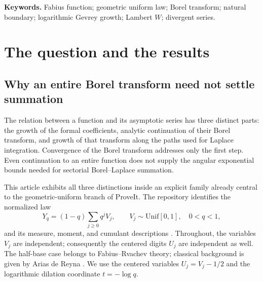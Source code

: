 \documentclass[11pt,a4paper]{article}
\numberwithin{equation}{section}
\theoremstyle{definition}
\theoremstyle{remark}
\begin{document}
\begin{titlepage}
\begin{abstract}
The proofs are self-contained after standard Bernoulli and hyperbolic-function identities. Exact rational checks and high-precision experiments accompany them. The results address a specified endpoint growth-and-summation question, not the separate minimal-moment-denominator conjecture. No Lean certification or independently established worldwide priority is asserted.
\end{abstract}
\vfill
{\small\textbf{Keywords.} Fabius function; geometric uniform law; Borel transform; natural boundary; logarithmic Gevrey growth; Lambert $W$; divergent series.\par}
\end{titlepage}
\hypersetup{pageanchor=true}

\begingroup
\small
\setlength{\parskip}{0pt}
\tableofcontents
\endgroup
\newpage
{}

\section{The question and the results}
\label{sec:intro}

\subsection{Why an entire Borel transform need not settle summation}
The relation between a function and its asymptotic series has three distinct parts: the growth of the formal coefficients, analytic continuation of their Borel transform, and growth of that transform along the paths used for Laplace integration. Convergence of the Borel transform addresses only the first step. Even continuation to an entire function does not supply the angular exponential bounds needed for sectorial Borel--Laplace summation.

This article exhibits all three distinctions inside an explicit family already central to the geometric-uniform branch of ProveIt. The repository identifies the normalized law
\begin{equation}
 Y_q=(1-q)\sum_{j\ge0}q^jV_j,
 \qquad V_j\sim\mathrm{Unif}[0,1],\quad 0<q<1,
 \label{eq:Y}
\end{equation}
and its measure, moment, and cumulant descriptions \cite{repo}. Throughout, the variables $V_j$ are independent; consequently the centered digits $U_j$ are independent as well. The half-base case belongs to Fabius--Rvachev theory; classical background is given by Arias de Reyna \cite{arias}. We use the centered variables $U_j=V_j-1/2$ and the logarithmic dilation coordinate $t=-\log q$.
\end{document}
